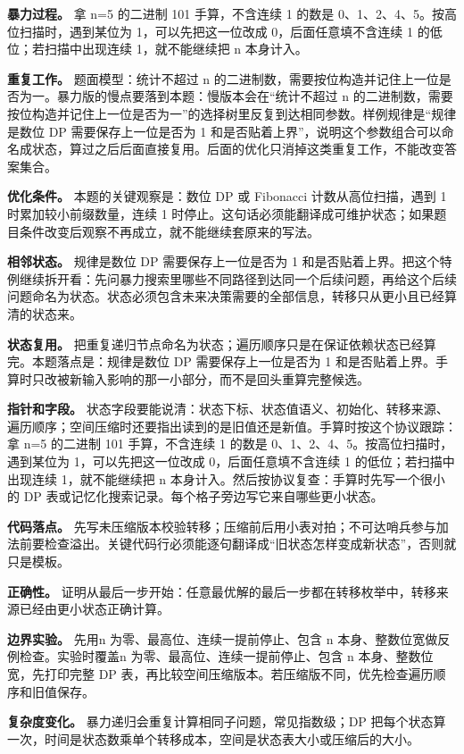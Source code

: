 \textbf{暴力过程。} 拿 n=5 的二进制 101 手算，不含连续 1 的数是 0、1、2、4、5。按高位扫描时，遇到某位为 1，可以先把这一位改成 0，后面任意填不含连续 1 的低位；若扫描中出现连续 1，就不能继续把 n 本身计入。

\textbf{重复工作。} 题面模型：统计不超过 n 的二进制数，需要按位构造并记住上一位是否为一。暴力版的慢点要落到本题：慢版本会在“统计不超过 n 的二进制数，需要按位构造并记住上一位是否为一”的选择树里反复到达相同参数。样例规律是“规律是数位 DP 需要保存上一位是否为 1 和是否贴着上界”，说明这个参数组合可以命名成状态，算过之后后面直接复用。后面的优化只消掉这类重复工作，不能改变答案集合。

\textbf{优化条件。} 本题的关键观察是：数位 DP 或 Fibonacci 计数从高位扫描，遇到 1 时累加较小前缀数量，连续 1 时停止。这句话必须能翻译成可维护状态；如果题目条件改变后观察不再成立，就不能继续套原来的写法。

\textbf{相邻状态。} 规律是数位 DP 需要保存上一位是否为 1 和是否贴着上界。把这个特例继续拆开看：先问暴力搜索里哪些不同路径到达同一个后续问题，再给这个后续问题命名为状态。状态必须包含未来决策需要的全部信息，转移只从更小且已经算清的状态来。

\textbf{状态复用。} 把重复递归节点命名为状态；遍历顺序只是在保证依赖状态已经算完。本题落点是：规律是数位 DP 需要保存上一位是否为 1 和是否贴着上界。手算时只改被新输入影响的那一小部分，而不是回头重算完整候选。

\textbf{指针和字段。} 状态字段要能说清：状态下标、状态值语义、初始化、转移来源、遍历顺序；空间压缩时还要指出读到的是旧值还是新值。手算时按这个协议跟踪：拿 n=5 的二进制 101 手算，不含连续 1 的数是 0、1、2、4、5。按高位扫描时，遇到某位为 1，可以先把这一位改成 0，后面任意填不含连续 1 的低位；若扫描中出现连续 1，就不能继续把 n 本身计入。然后按协议复查：手算时先写一个很小的 DP 表或记忆化搜索记录。每个格子旁边写它来自哪些更小状态。

\textbf{代码落点。} 先写未压缩版本校验转移；压缩前后用小表对拍；不可达哨兵参与加法前要检查溢出。关键代码行必须能逐句翻译成“旧状态怎样变成新状态”，否则就只是模板。

\textbf{正确性。} 证明从最后一步开始：任意最优解的最后一步都在转移枚举中，转移来源已经由更小状态正确计算。

\textbf{边界实验。} 先用n 为零、最高位、连续一提前停止、包含 n 本身、整数位宽做反例检查。实验时覆盖n 为零、最高位、连续一提前停止、包含 n 本身、整数位宽，先打印完整 DP 表，再比较空间压缩版本。若压缩版不同，优先检查遍历顺序和旧值保存。

\textbf{复杂度变化。} 暴力递归会重复计算相同子问题，常见指数级；DP 把每个状态算一次，时间是状态数乘单个转移成本，空间是状态表大小或压缩后的大小。

